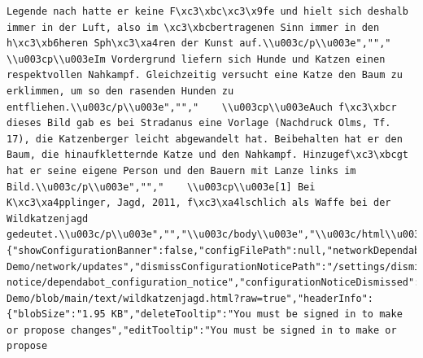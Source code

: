 \documentclass[
  letterpaper,
]{book}
\begin{document}
\begin{verbatim}
Legende nach hatte er keine F\xc3\xbc\xc3\x9fe und hielt sich deshalb immer in der Luft, also im \xc3\xbcbertragenen Sinn immer in den h\xc3\xb6heren Sph\xc3\xa4ren der Kunst auf.\\u003c/p\\u003e","","    \\u003cp\\u003eIm Vordergrund liefern sich Hunde und Katzen einen respektvollen Nahkampf. Gleichzeitig versucht eine Katze den Baum zu erklimmen, um so den rasenden Hunden zu entfliehen.\\u003c/p\\u003e","","    \\u003cp\\u003eAuch f\xc3\xbcr dieses Bild gab es bei Stradanus eine Vorlage (Nachdruck Olms, Tf. 17), die Katzenberger leicht abgewandelt hat. Beibehalten hat er den Baum, die hinaufkletternde Katze und den Nahkampf. Hinzugef\xc3\xbcgt hat er seine eigene Person und den Bauern mit Lanze links im Bild.\\u003c/p\\u003e","","    \\u003cp\\u003e[1] Bei K\xc3\xa4pplinger, Jagd, 2011, f\xc3\xa4lschlich als Waffe bei der Wildkatzenjagd gedeutet.\\u003c/p\\u003e","","\\u003c/body\\u003e","\\u003c/html\\u003e"],"stylingDirectives":null,"colorizedLines":null,"csv":null,"csvError":null,"dependabotInfo":{"showConfigurationBanner":false,"configFilePath":null,"networkDependabotPath":"/shionkim/CPS-Demo/network/updates","dismissConfigurationNoticePath":"/settings/dismiss-notice/dependabot_configuration_notice","configurationNoticeDismissed":null},"displayName":"wildkatzenjagd.html","displayUrl":"https://github.com/shionkim/CPS-Demo/blob/main/text/wildkatzenjagd.html?raw=true","headerInfo":{"blobSize":"1.95 KB","deleteTooltip":"You must be signed in to make or propose changes","editTooltip":"You must be signed in to make or propose 
\end{verbatim}
\end{document}
